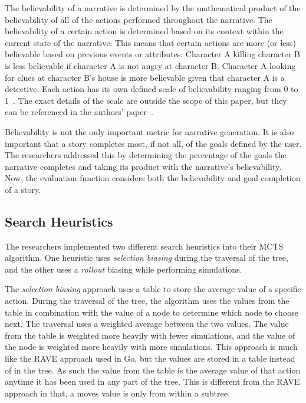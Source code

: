 \documentclass{sig-alternate}
\begin{document}
The believability of a narrative is determined by the mathematical product of the believability of all of the actions performed throughout the narrative. The believability of a certain action is determined based on its context within the current state of the narrative. This means that certain actions are more (or less) believable based on previous events or attributes: Character A killing character B is less believable if character A is not angry at character B. Character A looking for clues at character B's house is more believable given that character A is a detective. Each action has its own defined scale of believability ranging from 0 to 1~\cite{Narrative}. The exact details of the scale are outside the scope of this paper, but they can be referenced in the authors' paper~\cite{Narrative}.

Believability is not the only important metric for narrative generation. It is also important that a story completes most, if not all, of the goals defined by the user. The researchers addressed this by determining the percentage of the goals the narrative completes and taking its product with the narrative's believability. Now, the evaluation function considers both the believability and goal completion of a story. 

\subsection{Search Heuristics}
The researchers implemented two different search heuristics into their MCTS algorithm. One heuristic uses \textit{selection biasing} during the traversal of the tree, and the other uses a \textit{rollout} biasing while performing simulations.

The \textit{selection biasing} approach uses a table to store the average value of a specific action. During the traversal of the tree, the algorithm uses the values from the table in combination with the value of a node to determine which node to choose next. The traversal uses a weighted average between the two values. The value from the table is weighted more heavily with fewer simulations, and the value of the node is weighted more heavily with more simulations. This approach is much like the RAVE approach used in Go, but the values are stored in a table instead of in the tree. As such the value from the table is the average value of that action anytime it has been used in any part of the tree. This is different from the RAVE approach in that, a moves value is only from within a subtree.
\end{document}

